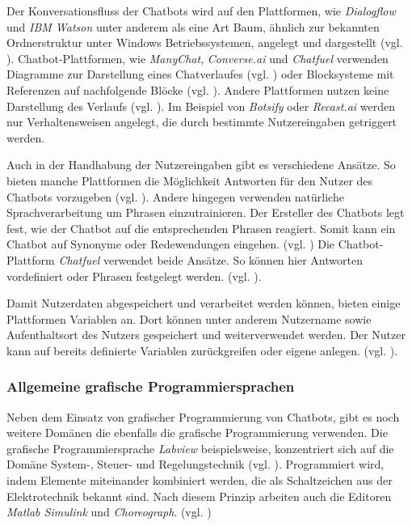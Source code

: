 Der Konversationsfluss der Chatbots wird auf den Plattformen, wie \emph{Dialogflow} und \emph{IBM Watson} unter anderem als eine Art Baum, ähnlich zur bekannten Ordnerstruktur unter Windows Betriebssystemen, angelegt und dargestellt (vgl. \cite{Dialogfl40:online} \cite{KatalogI56:online}). Chatbot-Plattformen, wie \emph{ManyChat}, \emph{Converse.ai} und \emph{Chatfuel} verwenden Diagramme zur Darstellung eines Chatverlaufes (vgl. \cite{Converse15:online} \cite{WelcomeM66:online}) oder Blocksysteme mit Referenzen auf nachfolgende Blöcke (vgl. \cite{Chatfuel3:online}). Andere Plattformen nutzen keine Darstellung des Verlaufs (vgl. \cite{BotsifyC64:online}). Im Beispiel von \emph{Botsify} oder \emph{Recast.ai} werden nur Verhaltensweisen angelegt, die durch bestimmte Nutzereingaben getriggert werden. 

Auch in der Handhabung der Nutzereingaben gibt es verschiedene Ansätze. So bieten manche Plattformen die Möglichkeit Antworten für den Nutzer des Chatbots vorzugeben (vgl. \cite{Chatfuel3:online} \cite{WelcomeM66:online}). Andere hingegen verwenden natürliche Sprachverarbeitung um Phrasen einzutrainieren. Der Ersteller des Chatbots legt fest, wie der Chatbot auf die entsprechenden Phrasen reagiert. Somit kann ein Chatbot auf Synonyme oder Redewendungen eingehen. (vgl. \cite{BotsifyC64:online} \cite{Dialogfl40:online} \cite{KatalogI56:online}) Die Chatbot-Plattform \emph{Chatfuel} verwendet beide Ansätze. So können hier Antworten vordefiniert oder Phrasen festgelegt werden. (vgl. \cite{Chatfuel3:online}). 

Damit Nutzerdaten abgespeichert und verarbeitet werden können, bieten einige Plattformen Variablen an. Dort können unter anderem Nutzername sowie Aufenthaltsort des Nutzers gespeichert und weiterverwendet werden. Der Nutzer kann auf bereits definierte Variablen zurückgreifen oder eigene anlegen. (vgl. \cite{Chatfuel3:online} \cite{Converse15:online} \cite{Dialogfl40:online} \cite{KatalogI56:online} \cite{WelcomeM66:online}). 


\subsubsection{Allgemeine grafische Programmiersprachen}

Neben dem Einsatz von grafischer Programmierung von Chatbots, gibt es noch weitere Domänen die ebenfalls die grafische Programmierung verwenden. Die grafische Programmiersprache \emph{Labview} beispielsweise, konzentriert sich auf die Domäne System-, Steuer- und Regelungstechnik (vgl. \cite{WasistLa94:online}). Programmiert wird, indem Elemente miteinander kombiniert werden, die als Schaltzeichen aus der Elektrotechnik bekannt sind. Nach diesem Prinzip arbeiten auch die Editoren \emph{Matlab Simulink} und \emph{Choreograph}. (vgl. \cite{Choregra47:online} \cite{Simulink28:online})

